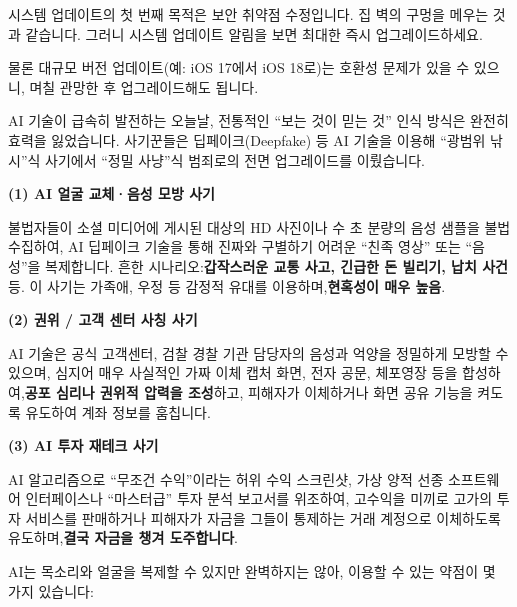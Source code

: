 
시스템 업데이트의 첫 번째 목적은 보안 취약점 수정입니다. 집 벽의 구멍을 메우는 것과 같습니다. 그러니 시스템 업데이트 알림을 보면 최대한 즉시 업그레이드하세요.

물론 대규모 버전 업데이트(예: iOS 17에서 iOS 18로)는 호환성 문제가 있을 수 있으니, 며칠 관망한 후 업그레이드해도 됩니다.


AI 기술이 급속히 발전하는 오늘날, 전통적인 “보는 것이 믿는 것” 인식 방식은 완전히 효력을 잃었습니다. 사기꾼들은 딥페이크(Deepfake) 등 AI 기술을 이용해 “광범위 낚시”식 사기에서 “정밀 사냥”식 범죄로의 전면 업그레이드를 이뤘습니다.


\textbf{(1) AI 얼굴 교체·음성 모방 사기}\par

불법자들이 소셜 미디어에 게시된 대상의 HD 사진이나 수 초 분량의 음성 샘플을 불법 수집하여, AI 딥페이크 기술을 통해 진짜와 구별하기 어려운 “친족 영상” 또는 “음성”을 복제합니다. 흔한 시나리오:\textbf{갑작스러운 교통 사고, 긴급한 돈 빌리기, 납치 사건}등. 이 사기는 가족애, 우정 등 감정적 유대를 이용하며,\textbf{현혹성이 매우 높음}.

\textbf{(2) 권위 / 고객 센터 사칭 사기}\par

AI 기술은 공식 고객센터, 검찰 경찰 기관 담당자의 음성과 억양을 정밀하게 모방할 수 있으며, 심지어 매우 사실적인 가짜 이체 캡처 화면, 전자 공문, 체포영장 등을 합성하여,\textbf{공포 심리나 권위적 압력을 조성}하고, 피해자가 이체하거나 화면 공유 기능을 켜도록 유도하여 계좌 정보를 훔칩니다.

\textbf{(3) AI 투자 재테크 사기}\par

AI 알고리즘으로 “무조건 수익”이라는 허위 수익 스크린샷, 가상 양적 선종 소프트웨어 인터페이스나 “마스터급” 투자 분석 보고서를 위조하여, 고수익을 미끼로 고가의 투자 서비스를 판매하거나 피해자가 자금을 그들이 통제하는 거래 계정으로 이체하도록 유도하며,\textbf{결국 자금을 챙겨 도주합니다}.


AI는 목소리와 얼굴을 복제할 수 있지만 완벽하지는 않아, 이용할 수 있는 약점이 몇 가지 있습니다:


